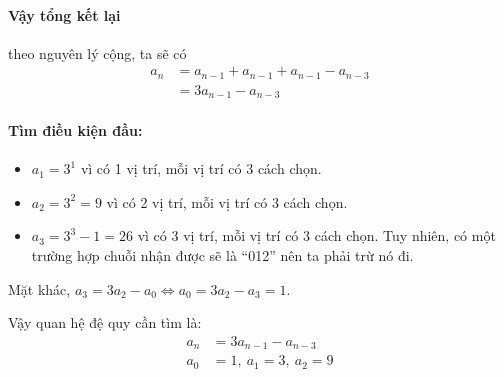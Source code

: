 \documentclass[main.tex]{subfiles}
\begin{document}
\paragraph{Vậy tổng kết lại} theo nguyên lý cộng, ta sẽ có
\begin{align*}
a_n &= a_{n-1} + a_{n-1} + a_{n-1} - a_{n-3}\\
&= 3a_{n-1} - a_{n-3}
\end{align*}

\paragraph*{Tìm điều kiện đầu:}
\begin{itemize}
    \item $a_1 = 3^1$ vì có 1 vị trí, mỗi vị trí có 3 cách chọn.
    \item $a_2 = 3^2 = 9$ vì có 2 vị trí, mỗi vị trí có 3 cách chọn.
    \item $a_3 = 3^3-1 = 26$ vì có 3 vị trí, mỗi vị trí có 3 cách chọn. Tuy nhiên, có một trường hợp chuỗi nhận được sẽ là ``012'' nên ta phải trừ nó đi.
\end{itemize}
Mặt khác, $a_3 = 3a_2 - a_0 \Leftrightarrow a_0 = 3a_2 - a_3 = 1$.

Vậy quan hệ đệ quy cần tìm là:
\begin{align*}
a_n &= 3a_{n-1} - a_{n-3} \\
a_0 &= 1,\ a_1 = 3,\ a_2 = 9
\end{align*}
\end{document}
